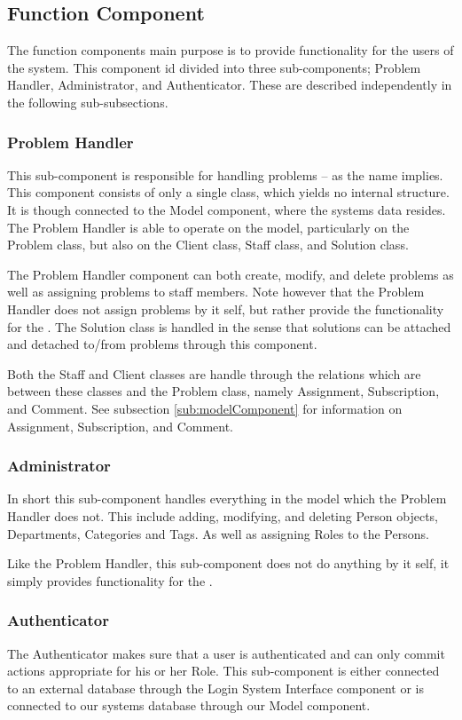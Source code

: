\subsection{Function Component}
The function components main purpose is to provide functionality for the users of the system.
This component id divided into three sub-components; Problem Handler, Administrator, and Authenticator.
These are described independently in the following sub-subsections.

\subsubsection{Problem Handler}
This sub-component is responsible for handling problems -- as the name implies.
This component consists of only a single class, which yields no internal structure.
It is though connected to the Model component, where the systems data resides.
The Problem Handler is able to operate on the model, particularly on the Problem class, but also on the Client class, Staff class, and Solution class.

The Problem Handler component can both create, modify, and delete problems as well as assigning problems to staff members.
Note however that the Problem Handler does not assign problems by it self, but rather provide the functionality for the \sinterface[].
The Solution class is handled in the sense that solutions can be attached and detached to/from problems through this component.

Both the Staff and Client classes are handle through the relations which are between these classes and the Problem class, namely Assignment, Subscription, and Comment. See subsection \ref{sub:modelComponent} for information on Assignment, Subscription, and Comment.

\subsubsection{Administrator}
In short this sub-component handles everything in the model which the Problem Handler does not.
This include adding, modifying, and deleting Person objects, Departments, Categories and Tags.
As well as assigning Roles to the Persons.

Like the Problem Handler, this sub-component does not do anything by it self, it simply provides functionality for the \ainterface[].

\subsubsection{Authenticator}
The Authenticator makes sure that a user is authenticated and can only commit actions appropriate for his or her Role.
This sub-component is either connected to an external database through the Login System Interface component or is connected to our systems database through our Model component.


